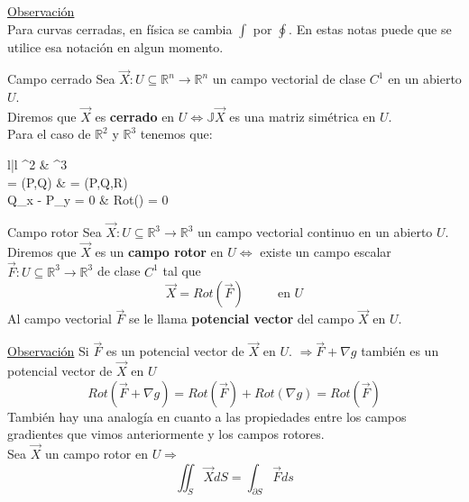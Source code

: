 \documentclass{report}
\newcommand\reals{\mathds{R}}
\begin{document}
\underline{Observación} \\ 
Para curvas cerradas, en física se cambia $\int{}$ por $\oint{}$. En estas notas puede que se utilice esa notación en algun momento.

\begin{defbox}{Campo cerrado}
	Sea $\vec{X}: U \subseteq \reals^n \rightarrow \reals^n$ un campo vectorial de clase $C^1$ en un abierto $U$. \\ 
	Diremos que $\vec{X}$ es \textbf{cerrado} en $U\iff \mathds{J}\vec{X}$ es una matriz simétrica en $U$.\\
	Para el caso de $\reals^2$ y $\reals^3$ tenemos que: \\

	\begin{array}{l|l}
		\reals^2 & \reals^3 \\ 
		 = (P,Q) &  = (P,Q,R) \\ 
		Q_x - P_y = 0 & Rot() = 0
	\end{array}
\end{defbox}



\begin{defbox}{Campo rotor}
	Sea $\vec{X}:U \subseteq \reals^3 \rightarrow \reals^3$ un campo vectorial continuo en un abierto $U$.
	Diremos que $\vec{X}$ es un \textbf{campo rotor} en $U \iff$ existe un campo escalar $\vec{F}:U\subseteq \reals^3 \rightarrow \reals^3$ de clase $C^1$ tal que
	\[
		\vec{X} = Rot(\vec{F}) ~~~~~~~~~~~~ \text{en }U
	\]
	Al campo vectorial $\vec{F}$ se le llama \textbf{potencial vector} del campo $\vec{X}$ en $U$.
\end{defbox}

\underline{Observación}
Si $\vec{F}$ es un potencial vector de $\vec{X}$ en $U$.
$\Rightarrow \vec{F} + \nabla g$ también es un potencial vector de $\vec{X}$ en $U$
\[
	Rot\left( \vec{F} + \nabla g \right) = Rot(\vec{F}) + Rot(\nabla g) = Rot(\vec{F})
\]
También  hay una analogía en cuanto a las propiedades entre los campos gradientes que vimos anteriormente y los campos rotores. \\
Sea $\vec{X}$ un campo rotor en $U \Rightarrow$
\[
	\iint_{S}{\vec{X}dS} = \int_{\partial S}{\vec{F}ds}
\]
\end{document}
